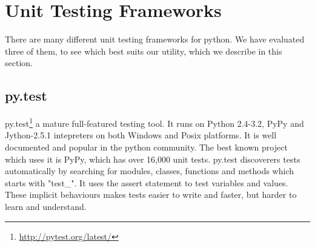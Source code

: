 \begin{table}[htbp] \footnotesize \center
\caption{Configuration summary\label{tab:pre:config}}
\noindent{}
\end{table}


\section{Unit Testing Frameworks}
\label{sec:pre:testing}
There are many different unit testing frameworks for python. We have evaluated
three of them, to see which best suits our utility, which we describe in this
section.

\subsection{py.test}
py.test\footnote{\url{http://pytest.org/latest/}} a mature full-featured testing
tool. It runs on Python 2.4-3.2, PyPy and Jython-2.5.1 intepreters on both
Windows and Posix platforms. It is well documented and popular in the python
community. The best known project which uses it is PyPy, which has over 16,000
unit tests. py.test discoverers tests automatically by searching for modules,
classes, functions and methods which starts with "test\_". It uses the assert
statement to test variables and values. These implicit behaviours makes tests
easier to write and faster, but harder to learn and understand.

